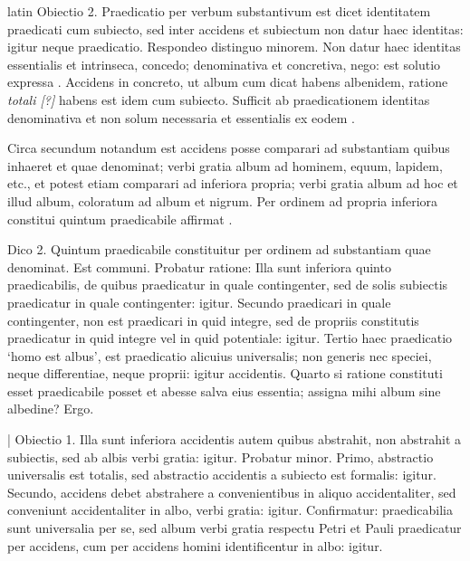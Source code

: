 \begin{otherlanguage*}{latin}
\pstart
  Obiectio 2. Praedicatio per verbum substantivum est dicet identitatem praedicati cum subiecto, sed inter accidens et subiectum non datur haec identitas: igitur neque praedicatio. Respondeo distinguo minorem. Non datur haec identitas essentialis et intrinseca, concedo; denominativa et concretiva, nego: est solutio expressa . Accidens in concreto, ut album cum dicat habens albenidem, ratione \emph{totali [?]} habens est idem cum subiecto. Sufficit ab praedicationem identitas denominativa et non solum necessaria et essentialis ex eodem . 
\pend

\pstart
  Circa secundum notandum est accidens posse comparari ad substantiam quibus inhaeret et quae denominat; verbi gratia album ad hominem, equum, lapidem, etc., et potest etiam comparari ad inferiora propria; verbi gratia album ad hoc et illud album, coloratum ad album et nigrum. Per ordinem ad propria inferiora constitui quintum praedicabile affirmat . 
\pend

\pstart
  Dico 2. Quintum praedicabile constituitur per ordinem ad substantiam quae denominat. Est communi. Probatur ratione: Illa sunt inferiora quinto praedicabilis, de quibus praedicatur in quale contingenter, sed de solis subiectis praedicatur in quale contingenter: igitur. Secundo praedicari in quale contingenter, non est praedicari in quid integre, sed de propriis constitutis praedicatur in quid integre vel in quid potentiale: igitur. Tertio haec praedicatio `homo est albus', est praedicatio alicuius universalis; non generis nec speciei, neque differentiae, neque proprii: igitur accidentis. Quarto si ratione constituti esset praedicabile posset et abesse salva eius essentia; assigna mihi album sine albedine? Ergo. 
\pend

\pstart
  \textnormal{|}   Obiectio 1. Illa sunt inferiora accidentis autem quibus abstrahit, non abstrahit a subiectis, sed ab albis verbi gratia: igitur. Probatur minor. Primo, abstractio universalis est totalis, sed abstractio accidentis a subiecto est formalis: igitur. Secundo, accidens debet abstrahere a convenientibus in aliquo accidentaliter, sed conveniunt accidentaliter in albo, verbi gratia: igitur. Confirmatur: praedicabilia sunt universalia per se, sed album verbi gratia respectu Petri et Pauli praedicatur per accidens, cum per accidens homini identificentur in albo: igitur. 
\pend


\end{otherlanguage*}
